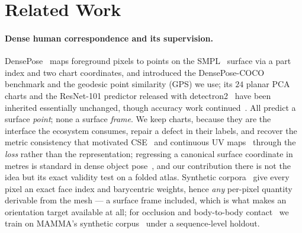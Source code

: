 \section{Related Work}
\label{sec:related}

\paragraph{Dense human correspondence and its supervision.}
DensePose~\cite{guler2018densepose} maps foreground pixels to points on the
SMPL~\cite{loper2015smpl} surface via a part index and two chart coordinates, and introduced the
DensePose-COCO benchmark and the geodesic point similarity (GPS) we use; its $24$ planar PCA charts
and the ResNet-101 predictor released with detectron2~\cite{wu2019detectron2} have been inherited
essentially unchanged, though accuracy work
continued~\cite{yang2019parsingrcnn,neverova2019slim,neverova2020cse,neverova2021ucm,shapovalov2021densepose3d,ianina2022bodymap,pozdeev2025densemarks,tan2021humangps}.
All predict a surface \emph{point}; none a surface \emph{frame}. We keep charts, because they are
the interface the ecosystem consumes, repair a defect in their labels, and recover the metric
consistency that motivated CSE~\cite{neverova2020cse} and continuous UV maps~\cite{zeng2020decomr}
through the \emph{loss} rather than the representation; regressing a canonical surface coordinate
in metres is standard in dense object
pose~\cite{wang2019nocs,park2019pix2pose,hodan2020epos,haugaard2022surfemb}, and our contribution
there is not the idea but its exact validity test on a folded atlas. Synthetic
corpora~\cite{varol2017surreal,patel2021agora,black2023bedlam,tesch2025bedlam2} give every pixel an
exact face index and barycentric weights, hence \emph{any} per-pixel quantity derivable from the
mesh --- a surface frame included, which is what makes an orientation target available at all; for
occlusion and body-to-body
contact~\cite{fieraru2020chi3d,yin2023hi4d,khirodkar2024harmony4d,xu2024interx} we train on MAMMA's
synthetic corpus~\cite{cuevas2025mamma} under a sequence-level holdout.

